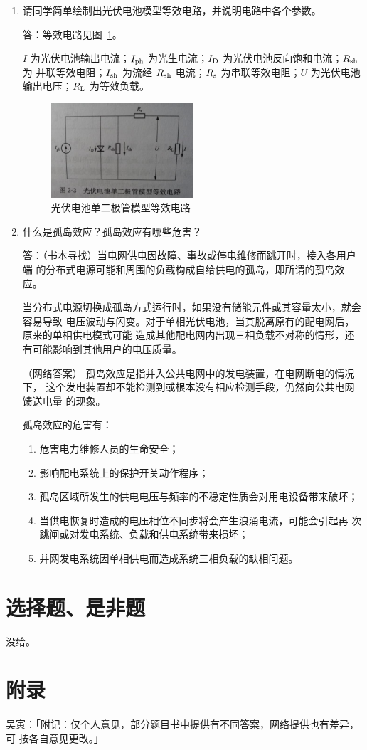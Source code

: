 \documentclass[zihao=-4]{ctexart}
\begin{document}
\begin{enumerate}
\item 请同学简单绘制出光伏电池模型等效电路，并说明电路中各个参数。

\noindent 答：等效电路见图~\ref{fig:4}。

$I$ 为光伏电池输出电流；$I_\mathrm{ph}$ 为光生电流；$I_\mathrm{D}$ 为光伏电池反向饱和电流；$R_\mathrm{sh}$ 为
并联等效电阻；$I_\mathrm{sh}$ 为流经 $R_\mathrm{sh}$ 电流；$R_\mathrm{s}$ 为串联等效电阻；$U$ 为光伏电池输出电压；$R_\mathrm{L}$ 为等效负载。

\begin{figure}[!htbp]
  \centering
  \includegraphics[width=0.5\textwidth]{fig4.png}
  \caption{光伏电池单二极管模型等效电路}\label{fig:4}
\end{figure}

\item 什么是孤岛效应？孤岛效应有哪些危害？

\noindent 答：（书本寻找）当电网供电因故障、事故或停电维修而跳开时，接入各用户端
的分布式电源可能和周围的负载构成自给供电的孤岛，即所谓的孤岛效应。

当分布式电源切换成孤岛方式运行时，如果没有储能元件或其容量太小，就会容易导致
电压波动与闪变。对于单相光伏电池，当其脱离原有的配电网后，原来的单相供电模式可能
造成其他配电网内出现三相负载不对称的情形，还有可能影响到其他用户的电压质量。

（网络答案） 孤岛效应是指并入公共电网中的发电装置，在电网断电的情况下，
这个发电装置却不能检测到或根本没有相应检测手段，仍然向公共电网馈送电量
的现象。

孤岛效应的危害有：
\begin{enumerate}
  \item 危害电力维修人员的生命安全；
  \item 影响配电系统上的保护开关动作程序；
  \item 孤岛区域所发生的供电电压与频率的不稳定性质会对用电设备带来破坏；
  \item 当供电恢复时造成的电压相位不同步将会产生浪涌电流，可能会引起再
  次跳闸或对发电系统、负载和供电系统带来损坏；
  \item 并网发电系统因单相供电而造成系统三相负载的缺相问题。
\end{enumerate}
\end{enumerate}
\section{选择题、是非题}
没给。
\section{附录}
吴寅：「附记：仅个人意见，部分题目书中提供有不同答案，网络提供也有差异，可
按各自意见更改。」
\end{document}
